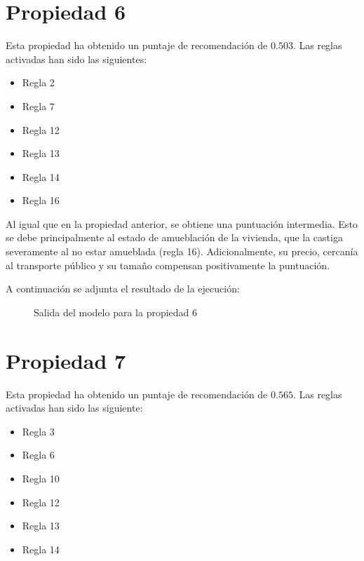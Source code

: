 \documentclass[12pt]{report} %
\begin{document}
    \section{Propiedad 6}
    Esta propiedad ha obtenido un puntaje de recomendación de $0.503$. Las
    reglas activadas han sido las siguientes: 
    \begin{itemize}
        \item Regla 2
        \item Regla 7
        \item Regla 12
        \item Regla 13
        \item Regla 14
        \item Regla 16
    \end{itemize}

    Al igual que en la propiedad anterior, se obtiene una puntuación intermedia.
    Esto se debe principalmente al estado de amueblación de la vivienda, que la
    castiga severamente al no estar amueblada (regla 16). Adicionalmente, su
    precio, cercanía al transporte público y su tamaño compensan positivamente
    la puntuación.

    A continuación se adjunta el resultado de la ejecución:
    \begin{figure}[H]
        \centering
        \caption{Salida del modelo para la propiedad 6}
    \end{figure}

    \section{Propiedad 7}
    Esta propiedad ha obtenido un puntaje de recomendación de $0.565$. Las
    reglas activadas han sido las siguiente:
    \begin{itemize}
        \item Regla 3
        \item Regla 6
        \item Regla 10
        \item Regla 12
        \item Regla 13
        \item Regla 14
    \end{itemize}
\end{document}

